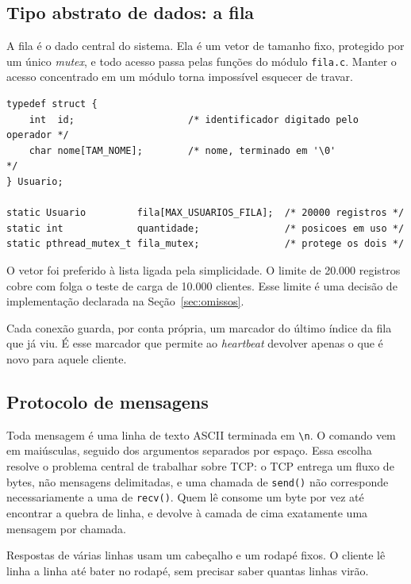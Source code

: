 \documentclass[12pt,a4paper]{article}
\begin{document}
\subsection{Tipo abstrato de dados: a fila}

A fila é o dado central do sistema. Ela é um vetor de tamanho fixo, protegido
por um único \textit{mutex}, e todo acesso passa pelas funções do módulo
\texttt{fila.c}. Manter o acesso concentrado em um módulo torna impossível
esquecer de travar.

\begin{lstlisting}[caption={Tipo \texttt{Usuario} e estado interno da fila.}]
typedef struct {
    int  id;                    /* identificador digitado pelo operador */
    char nome[TAM_NOME];        /* nome, terminado em '\0'              */
} Usuario;

static Usuario         fila[MAX_USUARIOS_FILA];  /* 20000 registros */
static int             quantidade;               /* posicoes em uso */
static pthread_mutex_t fila_mutex;               /* protege os dois */
\end{lstlisting}

O vetor foi preferido à lista ligada pela simplicidade. O limite de 20.000
registros cobre com folga o teste de carga de 10.000 clientes. Esse limite é uma
decisão de implementação declarada
na Seção~\ref{sec:omissos}.

Cada conexão guarda, por conta própria, um marcador do último índice da fila que
já viu. É esse marcador que permite ao \textit{heartbeat} devolver apenas o que
é novo para aquele cliente.

\subsection{Protocolo de mensagens}
\label{sec:protocolo}

Toda mensagem é uma linha de texto ASCII terminada em \texttt{\textbackslash n}.
O comando vem em maiúsculas, seguido dos argumentos separados por espaço. Essa
escolha resolve o problema central de trabalhar sobre TCP: o TCP entrega um
fluxo de bytes, não mensagens delimitadas, e uma chamada de \texttt{send()} não
corresponde necessariamente a uma de \texttt{recv()}. Quem lê consome um byte por
vez até encontrar a quebra de linha, e devolve à camada de cima exatamente uma
mensagem por chamada.

Respostas de várias linhas usam um cabeçalho e um rodapé fixos. O cliente lê
linha a linha até bater no rodapé, sem precisar saber quantas linhas virão.
\end{document}
